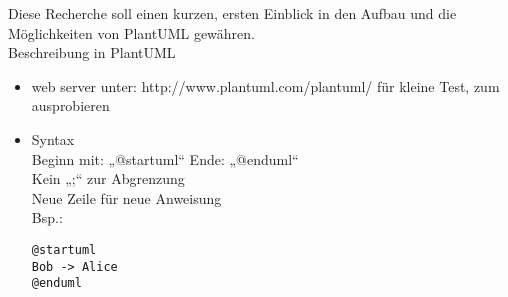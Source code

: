 
Diese Recherche soll einen kurzen, ersten Einblick in den Aufbau und die Möglichkeiten von PlantUML gewähren.\\
Beschreibung in PlantUML
\begin{itemize}
\item web server unter: http://www.plantuml.com/plantuml/ für kleine Test, zum ausprobieren

\item Syntax\\
Beginn mit: „@startuml“
Ende:  „@enduml“\\
Kein „;“ zur Abgrenzung\\
Neue Zeile für neue Anweisung\\
Bsp.:\\
\begin{lstlisting}
@startuml
Bob -> Alice
@enduml
\end{lstlisting}


\end{itemize}
